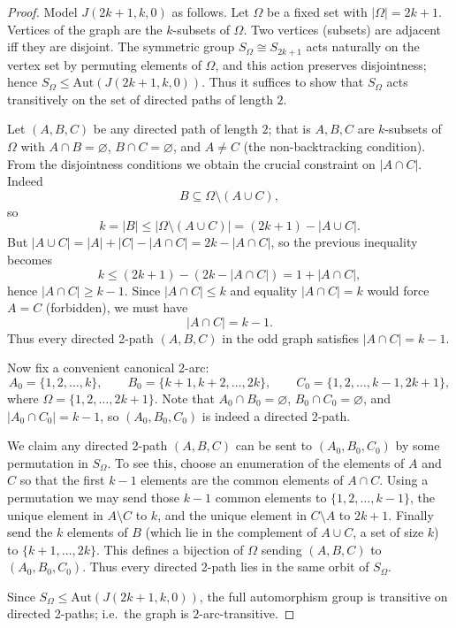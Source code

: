 \documentclass[12pt,a4paper,openany]{book}
\begin{document}
\begin{proof}
Model $J(2k+1,k,0)$ as follows. Let $\Omega$ be a fixed set with
$|\Omega|=2k+1$. Vertices of the graph are the $k$-subsets of $\Omega$.
Two vertices (subsets) are adjacent iff they are disjoint. The symmetric
group $S_{\Omega}\cong S_{2k+1}$ acts naturally on the vertex set by
permuting elements of $\Omega$, and this action preserves disjointness;
hence $S_{\Omega}\le \mathrm{Aut}(J(2k+1,k,0))$. Thus it suffices to
show that $S_{\Omega}$ acts transitively on the set of directed paths of
length $2$.

Let $(A,B,C)$ be any directed path of length \(2\); that is
\(A,B,C\) are \(k\)-subsets of \(\Omega\) with \(A\cap B=\varnothing\),
\(B\cap C=\varnothing\), and \(A\neq C\) (the non-backtracking
condition). From the disjointness conditions we obtain the crucial
constraint on \(|A\cap C|\). Indeed
\[
B\subseteq \Omega\setminus(A\cup C),
\]
so
\[
k = |B| \le |\Omega\setminus(A\cup C)| = (2k+1) - |A\cup C|.
\]
But $|A\cup C| = |A|+|C|-|A\cap C| = 2k-|A\cap C|$, so the previous
inequality becomes
\[
k \le (2k+1) - (2k-|A\cap C|) = 1 + |A\cap C|,
\]
hence \(|A\cap C|\ge k-1\). Since \(|A\cap C| \le k\) and equality
\(|A\cap C|=k\) would force \(A=C\) (forbidden), we must have
\[
|A\cap C| = k-1.
\]
Thus every directed 2-path \((A,B,C)\) in the odd graph satisfies
\(|A\cap C|=k-1\).

Now fix a convenient canonical 2-arc:
\[
A_0=\{1,2,\dots,k\},\qquad B_0=\{k+1,k+2,\dots,2k\},\qquad
C_0=\{1,2,\dots,k-1,2k+1\},
\]
where $\Omega=\{1,2,\dots,2k+1\}$. Note that $A_0\cap B_0=\varnothing$,
$B_0\cap C_0=\varnothing$, and $|A_0\cap C_0|=k-1$, so $(A_0,B_0,C_0)$ is
indeed a directed 2-path.

We claim any directed 2-path \((A,B,C)\) can be sent to
\((A_0,B_0,C_0)\) by some permutation in \(S_{\Omega}\). To see this,
choose an enumeration of the elements of \(A\) and \(C\) so that the
first \(k-1\) elements are the common elements of \(A\cap C\). Using a
permutation we may send those \(k-1\) common elements to
\(\{1,2,\dots,k-1\}\), the unique element in \(A\setminus C\) to \(k\),
and the unique element in \(C\setminus A\) to \(2k+1\). Finally send the
\(k\) elements of \(B\) (which lie in the complement of \(A\cup C\), a
set of size \(k\)) to \(\{k+1,\dots,2k\}\). This defines a bijection of
\(\Omega\) sending \((A,B,C)\) to \((A_0,B_0,C_0)\). Thus every directed
2-path lies in the same orbit of \(S_{\Omega}\).

Since $S_{\Omega}\le\mathrm{Aut}(J(2k+1,k,0))$, the full automorphism
group is transitive on directed 2-paths; i.e.\ the graph is
$2$-arc-transitive.
\end{proof}
\end{document}
